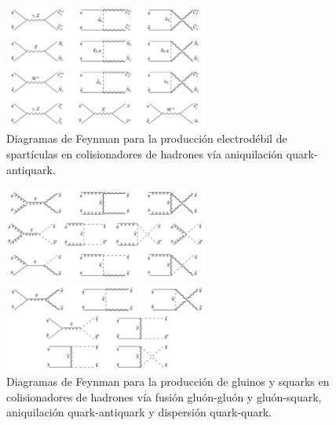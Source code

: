 
\begin{figure}[!htb]
  \centering \includegraphics[width=0.6\textwidth]{figures/figure_101}
  \caption{Diagramas de Feynman para la producción electrodébil de spartículas
    en colisionadores de hadrones vía aniquilación quark-antiquark.}
  \label{fig:ewkprod}
\end{figure}

\begin{figure}[!htb]
  \centering

  \includegraphics[width=0.6\textwidth]{figures/figure_102}

  \includegraphics[width=0.6\textwidth]{figures/figure_103}

  \caption{Diagramas de Feynman para la producción de gluinos y squarks en
    colisionadores de hadrones vía fusión gluón-gluón y gluón-squark,
    aniquilación quark-antiquark y dispersión quark-quark.}
  \label{fig:strongprod}
\end{figure}


